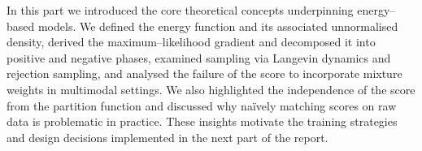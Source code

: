 In this part we introduced the core theoretical concepts underpinning
energy–based models.  We defined the energy function and its associated
unnormalised density, derived the maximum–likelihood gradient and
decomposed it into positive and negative phases, examined sampling via
Langevin dynamics and rejection sampling, and analysed the failure of the
score to incorporate mixture weights in multimodal settings.  We also
highlighted the independence of the score from the partition function and
discussed why naïvely matching scores on raw data is problematic in
practice.  These insights motivate the training strategies and design
decisions implemented in the next part of the report.
